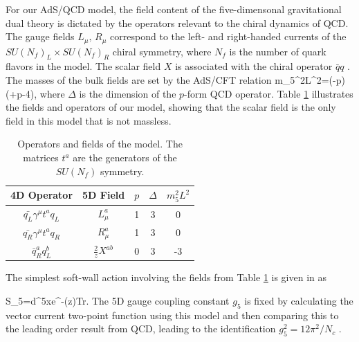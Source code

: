 For our AdS/QCD model, the field content of the five-dimensonal gravitational dual theory is dictated by the operators relevant to the chiral dynamics of QCD. 
The gauge fields $L_{\mu},\, R_{\mu}$ correspond to the left- and right-handed currents of the $SU(N_{f})_{L}\times SU(N_{f})_{R}$ chiral symmetry, where $N_{f}$ is the number of quark flavors in
the model. 
The scalar field $X$ is associated with the chiral operator $\bar{q}q$ \cite{stephanov-katz-son}. 
The masses of the bulk fields are set by the AdS/CFT relation \cite{colangelo-light-scalar-mesons} 
\be
m_{5}^{2}L^{2}=(\Delta-p)(\Delta+p-4), 
\ee
where $\Delta$ is the dimension of the $p$-form QCD operator. 
Table \ref{tab:Operators-and-fields} illustrates the fields and operators of our model, showing that the scalar field is the only field in this model that is not massless.

\begin{table}[htb]
\begin{center}
\begin{tabular}{|c|c|c|c|c|}
\hline 
4D Operator & 5D Field & $p$ & $\Delta$ & $m_{5}^{2}L^{2}$\\
\hline 
\hline 
$\bar{q_{L}}\gamma^{\mu}t^{a}q_{L}$ & $L_{\mu}^{a}$ & 1 & 3 & 0\\
\hline 
$\bar{q_{R}}\gamma^{\mu}t^{a}q_{R}$ & $R_{\mu}^{a}$ & 1 & 3 & 0\\
\hline 
$\bar{q}_{R}^{a}q_{L}^{b}$ & $\frac{2}{z}X^{ab}$ & 0 & 3 & -3\\
\hline 
\end{tabular}
\end{center}
\caption{Operators and fields of the model. The matrices $t^{a}$ are the generators of the $SU(N_{f})$ symmetry. 
\label{tab:Operators-and-fields}}
\end{table}

The simplest soft-wall action involving the fields from Table \ref{tab:Operators-and-fields}
is given in \cite{karch-katz-son-adsqcd} as 

\be
S_{5}=\int d^{5}xe^{-\Phi(z)}Tr.
\label{eq:SimpleAction}
\ee
The 5D gauge coupling constant $g_{5}$ is fixed by calculating the vector current two-point function using this model and then comparing this to the leading order result from QCD, leading to the identification $g_{5}^{2}=12\pi^{2}/N_{c}$ \cite{stephanov-katz-son}. 

